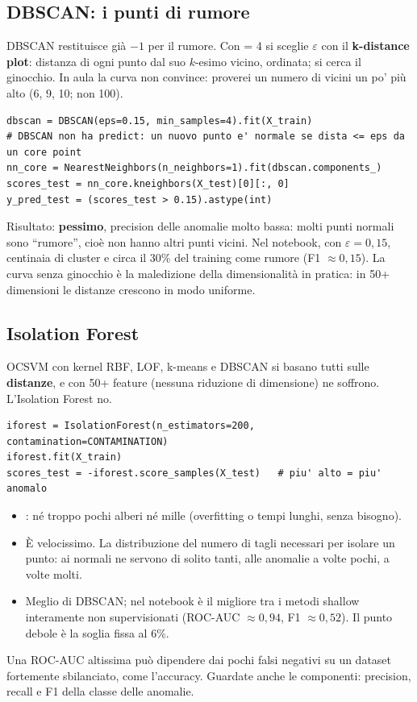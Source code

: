 \subsection{DBSCAN: i punti di rumore}
DBSCAN restituisce già $-1$ per il rumore. Con  = 4 si sceglie $\varepsilon$ con il \textbf{k-distance plot}: distanza
di ogni punto dal suo $k$-esimo vicino, ordinata; si cerca il ginocchio. In aula la curva non convince: proverei un numero di vicini un
po' più alto (6, 9, 10; non 100).
\begin{lstlisting}
dbscan = DBSCAN(eps=0.15, min_samples=4).fit(X_train)
# DBSCAN non ha predict: un nuovo punto e' normale se dista <= eps da un core point
nn_core = NearestNeighbors(n_neighbors=1).fit(dbscan.components_)
scores_test = nn_core.kneighbors(X_test)[0][:, 0]
y_pred_test = (scores_test > 0.15).astype(int)
\end{lstlisting}
Risultato: \textbf{pessimo}, precision delle anomalie molto bassa: molti punti normali sono ``rumore'', cioè non hanno altri punti vicini.
Nel notebook, con $\varepsilon=0{,}15$, centinaia di cluster e circa il 30\% del training come rumore (F1 $\approx 0{,}15$). La curva senza
ginocchio è la maledizione della dimensionalità in pratica: in 50+ dimensioni le distanze crescono in modo uniforme.

\subsection{Isolation Forest}
OCSVM con kernel RBF, LOF, k-means e DBSCAN si basano tutti sulle \textbf{distanze}, e con 50+ feature (nessuna riduzione di dimensione)
ne soffrono. L'Isolation Forest no.
\begin{lstlisting}
iforest = IsolationForest(n_estimators=200, contamination=CONTAMINATION)
iforest.fit(X_train)
scores_test = -iforest.score_samples(X_test)   # piu' alto = piu' anomalo
\end{lstlisting}
\begin{itemize}
  \item {}: né troppo pochi alberi né mille (overfitting o tempi lunghi, senza bisogno).
  \item È velocissimo. La distribuzione del numero di tagli necessari per isolare un punto: ai normali ne servono di solito tanti, alle
        anomalie a volte pochi, a volte molti.
  \item Meglio di DBSCAN; nel notebook è il migliore tra i metodi shallow interamente non supervisionati (ROC-AUC $\approx 0{,}94$,
        F1 $\approx 0{,}52$). Il punto debole è la soglia fissa al 6\%.
\end{itemize}
\begin{attenzione}
Una ROC-AUC altissima può dipendere dai pochi falsi negativi su un dataset fortemente sbilanciato, come l'accuracy. Guardate anche le
componenti: precision, recall e F1 della classe delle anomalie.
\end{attenzione}

